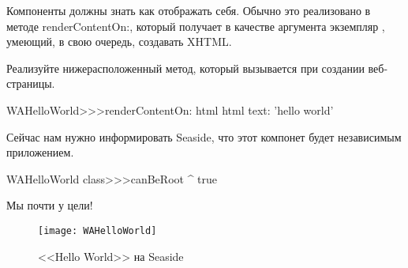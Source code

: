 \documentclass[a4paper,10pt,twoside]{book}
\begin{document}
Компоненты должны знать как отображать себя.
Обычно это реализовано в методе 
{renderContentOn:},
который получает в качестве аргумента экземпляр ,
умеющий, в свою очередь, создавать XHTML.



Реализуйте нижерасположенный метод, который вызывается при создании веб-страницы.

\begin{code}{}
WAHelloWorld>>>renderContentOn: html
	html text: 'hello world'
\end{code}


\noindent
Сейчас нам нужно информировать Seaside,
что этот компонет будет независимым приложением.


\begin{code}{}
WAHelloWorld class>>>canBeRoot
	^ true
\end{code}


\noindent
Мы почти у цели!



\begin{figure}[htb]
\begin{center}
\texttt{[image: WAHelloWorld]}
\caption{<<Hello World>> на Seaside}
\end{center}
\end{figure}
\end{document}
